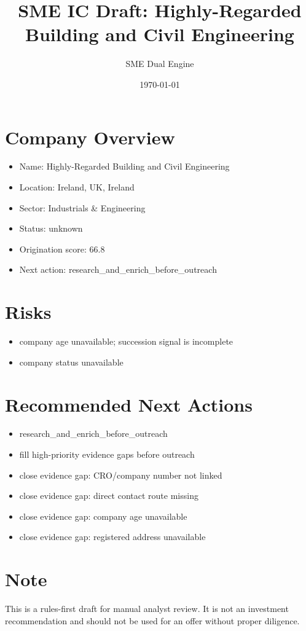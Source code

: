 \documentclass[11pt,a4paper]{article}
\title{SME IC Draft: Highly-Regarded Building and Civil Engineering}
\author{SME Dual Engine}
\date{\today}
\begin{document}
\maketitle
\section*{Company Overview}
\begin{itemize}[leftmargin=1.4em]
\item Name: Highly-Regarded Building and Civil Engineering
\item Location: Ireland, UK, Ireland
\item Sector: Industrials \& Engineering
\item Status: unknown
\item Origination score: 66.8
\item Next action: research\_and\_enrich\_before\_outreach
\end{itemize}
\section*{Risks}
\begin{itemize}[leftmargin=1.4em]
\item company age unavailable; succession signal is incomplete
\item company status unavailable
\end{itemize}
\section*{Recommended Next Actions}
\begin{itemize}[leftmargin=1.4em]
\item research\_and\_enrich\_before\_outreach
\item fill high-priority evidence gaps before outreach
\item close evidence gap: CRO/company number not linked
\item close evidence gap: direct contact route missing
\item close evidence gap: company age unavailable
\item close evidence gap: registered address unavailable
\end{itemize}
\section*{Note}
This is a rules-first draft for manual analyst review. It is not an investment
recommendation and should not be used for an offer without proper diligence.
\end{document}
